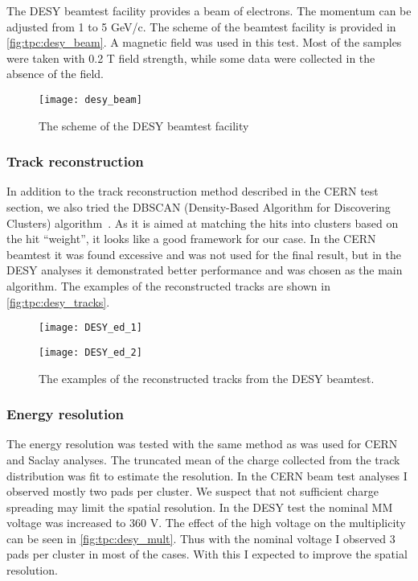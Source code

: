 \documentclass[../main.tex]{subfiles}
\begin{document}
The DESY beamtest facility provides a beam of electrons. The momentum can be adjusted from 1 to 5 GeV/c. The scheme of the beamtest facility is provided in \autoref{fig:tpc:desy_beam}. A magnetic field was used in this test. Most of the samples were taken with 0.2 T field strength, while some data were collected in the absence of the field.

\begin{figure}[!ht]
  \centering
  \texttt{[image: desy\_beam]}
  \caption{The scheme of the DESY beamtest facility}
  \label{fig:tpc:desy_beam}
\end{figure}

\subsubsection{Track reconstruction}
In addition to the track reconstruction method described in the CERN test section, we also tried the DBSCAN (Density-Based Algorithm for Discovering Clusters) algorithm~\cite{Ester1996}. As it is aimed at matching the hits into clusters based on the hit ``weight'', it looks like a good framework for our case. In the CERN beamtest it was found excessive and was not used for the final result, but in the DESY analyses it demonstrated better performance and was chosen as the main algorithm. The examples of the reconstructed tracks are shown in \autoref{fig:tpc:desy_tracks}.

\begin{figure}[!ht]
  \centering
  \begin{minipage}{0.49\linewidth}
    \centering
    \texttt{[image: DESY\_ed\_1]}
  \end{minipage}
  \begin{minipage}{0.49\linewidth}
    \centering
    \texttt{[image: DESY\_ed\_2]}
  \end{minipage}
  \caption{The examples of the reconstructed tracks from the DESY beamtest.}
  \label{fig:tpc:desy_tracks}
\end{figure}

\subsubsection{Energy resolution}
The energy resolution was tested with the same method as was used for CERN and Saclay analyses. The truncated mean of the charge collected from the track distribution was fit to estimate the resolution. In the CERN beam test analyses I observed mostly two pads per cluster. We suspect that not sufficient charge spreading may limit the spatial resolution. In the DESY test the nominal MM voltage was increased to 360 V. The effect of the high voltage on the multiplicity can be seen in \autoref{fig:tpc:desy_mult}. Thus with the nominal voltage I observed 3 pads per cluster in most of the cases. With this I expected to improve the spatial resolution.
\end{document}
